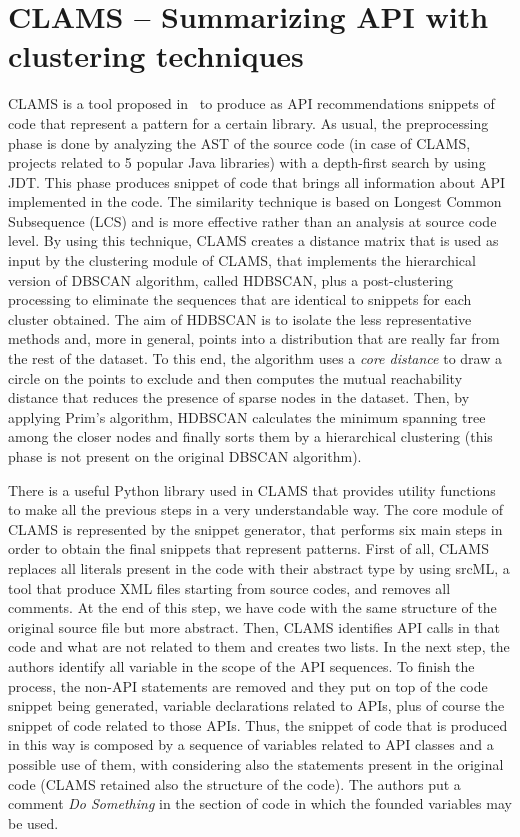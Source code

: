 \section{CLAMS -- Summarizing API with clustering techniques}
CLAMS is a tool proposed in~\cite{katirtzis_summarizing_2018} to produce as API 
recommendations snippets of code that represent a pattern for a certain 
library. As usual, the preprocessing phase is done by analyzing the AST of the 
source code (in case of CLAMS, projects related to 5 popular Java libraries) 
with a depth-first search by using JDT. This phase produces snippet of code 
that brings all information about API implemented in the code. The similarity 
technique is based on Longest Common Subsequence (LCS) and is more effective 
rather than an analysis at source code level. By using this technique, CLAMS 
creates a distance matrix that is used as input by the clustering module of 
CLAMS, that implements the hierarchical version of DBSCAN algorithm, called 
HDBSCAN, plus a post-clustering processing to eliminate the sequences that are 
identical to snippets for each cluster obtained. The aim of HDBSCAN is to 
isolate the less representative methods and, more in general, points into a 
distribution that are really far from the rest of the dataset. To this end, the 
algorithm uses a \textit{core distance} to draw a circle on the points to 
exclude and then computes the mutual reachability distance that reduces the 
presence of sparse nodes in the dataset. Then, by applying Prim's algorithm, 
HDBSCAN calculates the minimum spanning tree among the closer nodes and finally 
sorts them by a hierarchical clustering (this phase is not present on the 
original DBSCAN algorithm). 

There is a useful Python library used in CLAMS that provides utility functions 
to make all the previous steps in a very understandable way. The core module of 
CLAMS is represented by the snippet generator, that performs six main steps in 
order to obtain the final snippets that represent patterns. First of all, CLAMS 
replaces all literals present in the code with their abstract type by using 
srcML, a tool that produce XML files starting from source codes, and removes 
all comments. At the end of this step, we have code with the same structure of 
the original source file but more abstract. Then, CLAMS identifies API calls in 
that code and what are not related to them and creates two lists. In the next 
step, the authors identify all variable in the scope of the API sequences. To 
finish the process, the non-API statements are removed and they put on top of 
the code snippet being generated, variable declarations related to APIs, plus 
of course the snippet of code related to those APIs. Thus, the snippet of code 
that is produced in this way is composed by a sequence of variables related to 
API classes and a possible use of them, with considering also the statements 
present in the original code (CLAMS retained also the structure of the code). 
The authors put a comment \textit{Do Something} in the section of code in which 
the founded variables may be used. 

